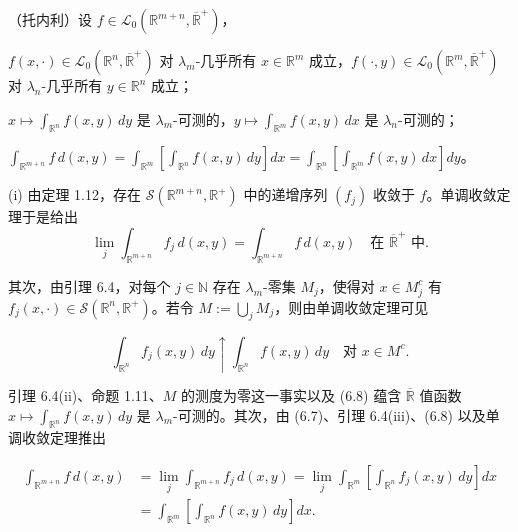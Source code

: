 \begin{theorem}

（托内利）设 $ f \in \mathcal{L}_{0}(\mathbb{R}^{m+n}, \overline{\mathbb{R}}^{+}) $，

\begin{subitems}
\item

$ f(x, \cdot) \in \mathcal{L}_{0}(\mathbb{R}^n, \overline{\mathbb{R}}^{+}) $ 对 $ \lambda_m $-几乎所有 $ x \in \mathbb{R}^m $ 成立，$ f(\cdot, y) \in \mathcal{L}_{0}(\mathbb{R}^m, \overline{\mathbb{R}}^{+}) $ 对 $ \lambda_n $-几乎所有 $ y \in \mathbb{R}^n $ 成立；

\item

$ x \mapsto \int_{\mathbb{R}^n} f(x, y) \, dy $ 是 $ \lambda_m $-可测的，$ y \mapsto \int_{\mathbb{R}^m} f(x, y) \, dx $ 是 $ \lambda_n $-可测的；

\item

$ \int_{\mathbb{R}^{m+n}} f \, d(x, y) = \int_{\mathbb{R}^m} \left[ \int_{\mathbb{R}^n} f(x, y) \, dy \right] dx = \int_{\mathbb{R}^n} \left[ \int_{\mathbb{R}^m} f(x, y) \, dx \right] dy $。

\proofhead
(i) 由定理 1.12，存在 $ \mathcal{S}(\mathbb{R}^{m+n}, \mathbb{R}^{+}) $ 中的递增序列 $ (f_j) $ 收敛于 $ f $。单调收敛定理于是给出
\begin{equation}
\lim_j \int_{\mathbb{R}^{m+n}} f_j \, d(x, y) = \int_{\mathbb{R}^{m+n}} f \, d(x, y) \quad \text{在 } \overline{\mathbb{R}}^{+} \text{ 中} .\tag{6.7}
\end{equation}

其次，由引理 6.4，对每个 $ j \in \mathbb{N} $ 存在 $ \lambda_m $-零集 $ M_j $，使得对 $ x \in M_j^{c} $ 有 $ f_j(x, \cdot) \in \mathcal{S}(\mathbb{R}^n, \mathbb{R}^{+}) $。若令 $ M := \bigcup_j M_j $，则由单调收敛定理可见

\begin{equation}
\int_{\mathbb{R}^n} f_j(x, y) \, dy \uparrow \int_{\mathbb{R}^n} f(x, y) \, dy \quad \text{对 } x \in M^{c} .\tag{6.8}
\end{equation}

引理 6.4(ii)、命题 1.11、$ M $ 的测度为零这一事实以及 (6.8) 蕴含 $ \overline{\mathbb{R}} $ 值函数 $ x \mapsto \int_{\mathbb{R}^n} f(x, y) \, dy $ 是 $ \lambda_m $-可测的。其次，由 (6.7)、引理 6.4(iii)、(6.8) 以及单调收敛定理推出

\begin{equation*}
\begin{aligned}
\int_{\mathbb{R}^{m+n}} f \, d(x, y) &= \lim_j \int_{\mathbb{R}^{m+n}} f_j \, d(x, y) = \lim_j \int_{\mathbb{R}^m} \left[ \int_{\mathbb{R}^n} f_j(x, y) \, dy \right] dx \\ &= \int_{\mathbb{R}^m} \left[ \int_{\mathbb{R}^n} f(x, y) \, dy \right] dx .
\end{aligned}
\end{equation*}


\end{subitems}
\end{theorem}
